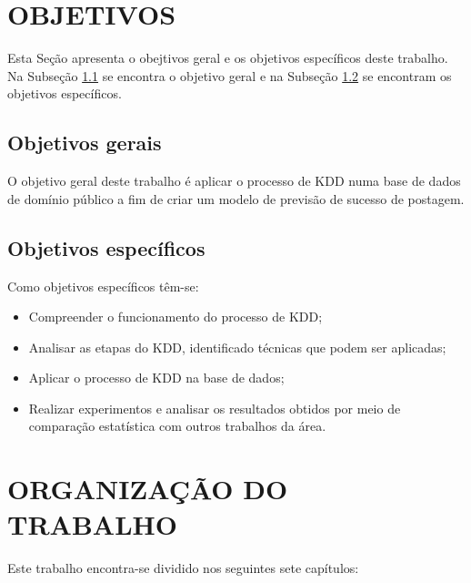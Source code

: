 \section{OBJETIVOS}
\label{sec:objetivos}
Esta Seção apresenta o obejtivos geral e os objetivos específicos deste trabalho. Na Subseção \ref{subsec:objGerais} se encontra o objetivo geral e na Subseção \ref{subsec:objEspecificos} se encontram os objetivos específicos.

\subsection{Objetivos gerais}
\label{subsec:objGerais}
O objetivo geral deste trabalho é aplicar o processo de KDD numa base de dados de domínio público a fim de criar um modelo de previsão de sucesso de postagem.

\subsection{Objetivos específicos}
\label{subsec:objEspecificos}
Como objetivos específicos têm-se:
\begin{itemize}
	\item Compreender o funcionamento do processo de KDD;
	\item Analisar as etapas do KDD, identificado técnicas que podem ser aplicadas;
	\item Aplicar o processo de KDD na base de dados;
	\item Realizar experimentos e analisar os resultados obtidos por meio de comparação estatística com outros trabalhos da área.
\end{itemize}

\section{ORGANIZAÇÃO DO TRABALHO}
\label{sec:organizacaoTrabalho}
Este trabalho encontra-se dividido nos seguintes sete capítulos:

